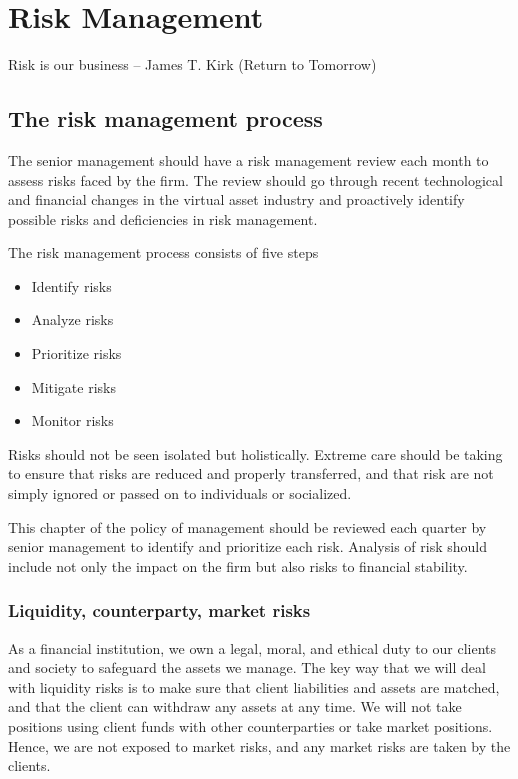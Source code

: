 \chapter{Risk Management}

Risk is our business – James T. Kirk (Return to Tomorrow)



\section{The risk management process}

The senior management should have a risk management review each month
to assess risks faced by the firm.  The review should go through
recent technological and financial changes in the virtual asset
industry and proactively identify possible risks and deficiencies in
risk management.

The risk management process consists of five steps
\begin{itemize}
\item Identify risks
\item Analyze risks
\item Prioritize risks
\item Mitigate risks
\item Monitor risks
\end{itemize}

Risks should not be seen isolated but holistically.  Extreme care
should be taking to ensure that risks are reduced and properly
transferred, and that risk are not simply ignored or passed on to
individuals or socialized.

This chapter of the policy of management should be reviewed each quarter
by senior management to identify and prioritize each risk.
Analysis of risk should include not only the impact on the firm but also
risks to financial stability.

\subsection{Liquidity, counterparty, market risks}


As a financial institution, we own a legal, moral, and ethical duty to
our clients and society to safeguard the assets we manage.  The key
way that we will deal with liquidity risks is to make sure that client
liabilities and assets are matched, and that the client can
withdraw any assets at any time.  We will not take positions using
client funds with other counterparties or take market positions. Hence,
we are not exposed to market risks, and any market risks are taken by
the clients.

